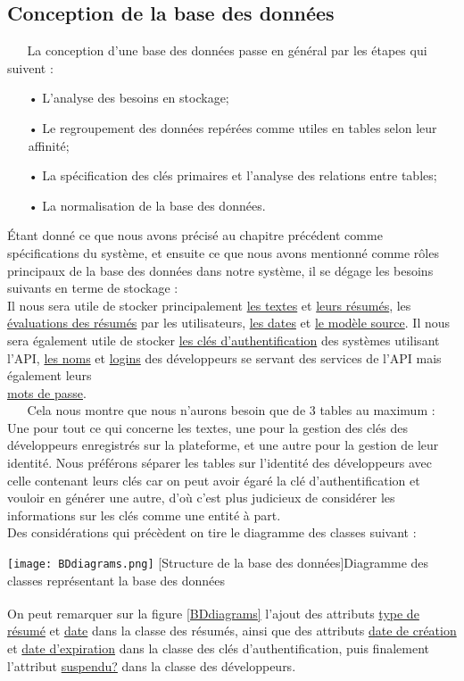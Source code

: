\subsection{Conception de la base des données}
$ _{} $ $ _{} $ $ _{} $ $ _{} $ $ _{} $La conception d'une base des données passe en général par les étapes qui suivent \cite{rigaux2001cours} :
\begin{itemize}
\item[•] L'analyse des besoins en stockage;
\item[•] Le regroupement des données repérées comme utiles en tables selon leur affinité;
\item[•] La spécification des clés primaires et l'analyse des relations entre tables;
\item[•] La normalisation de la base des données.
\end{itemize}
Étant donné ce que nous avons précisé au chapitre précédent comme spécifications du système, et ensuite ce que nous avons mentionné comme rôles principaux de la base des données dans notre système, il se dégage les besoins suivants en terme de stockage :\\
Il nous sera utile de stocker principalement \underline{les textes} et \underline{leurs résumés}, les \\
\underline{évaluations des résumés} par les utilisateurs, \underline{les dates} et \underline{le modèle source}. Il nous sera également utile de stocker \underline{les clés d'authentification} des systèmes utilisant l'API, \underline{les noms} et \underline{ logins} des développeurs se servant des services de l'API mais également leurs\\ \underline{mots de passe}.\\
$ _{} $ $ _{} $ $ _{} $ $ _{} $ $ _{} $Cela nous montre que nous n'aurons besoin que de $ 3 $ tables au maximum :\\
Une pour tout ce qui concerne les textes, une pour la gestion des clés des développeurs  enregistrés sur la plateforme, et une autre pour la gestion de leur identité. Nous préférons séparer les tables sur l'identité des développeurs avec celle contenant leurs clés car on peut avoir égaré la clé d'authentification et vouloir en générer une autre, d'où c'est plus judicieux de considérer les informations sur les clés comme une entité à part.\\
Des considérations qui précèdent on tire le diagramme des classes suivant :\newpage
$ _{ } $
\begin{center}
\texttt{[image: BDdiagrams.png]}
[Structure de la base des données]{Diagramme des classes représentant la base des données} \label{BDdiagrams}
\end{center}
$ _{ } $\\
On peut remarquer sur la figure \ref{BDdiagrams} l'ajout des attributs \underline{type de résumé} et \underline{date} dans la classe des résumés, ainsi que des attributs \underline{date de création} et \underline{date d'expiration} dans la classe des clés d'authentification, puis finalement l'attribut \underline{suspendu?} dans la classe des développeurs.

